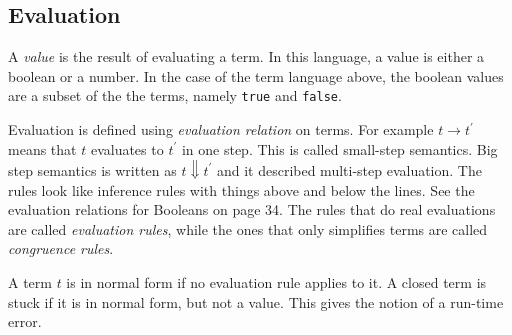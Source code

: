 \documentclass[fleqn]{article}
\begin{document}
\subsection*{Evaluation}
A \emph{value} is the result of evaluating a term. In this language, a value is either a boolean or a number. In the case of the term language above, the boolean values are a subset of the the terms, namely \verb|true| and \verb|false|. 

Evaluation is defined using \emph{evaluation relation} on terms. For example $ t \rightarrow t^\prime$ means that $t$ evaluates to $ t^\prime$ in one step. This is called small-step semantics. Big step semantics is written as $t \Downarrow t^\prime$ and it described multi-step evaluation. The rules look like inference rules with things above and below the lines. See the evaluation relations for Booleans on page 34. The rules that do real evaluations are called \emph{evaluation rules}, while the ones that only simplifies terms are called \emph{congruence rules}. 

A term $t$ is in normal form if no evaluation rule applies to it. A closed term is stuck if it is in normal 
form, but not a value. This gives the notion of a run-time error. 
\end{document}
